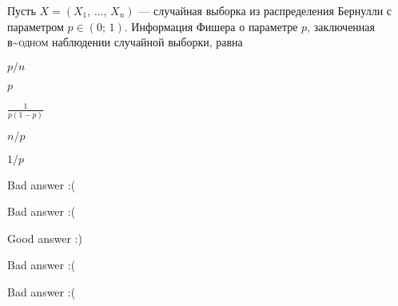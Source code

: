 
\begin{question}
Пусть \(X = (X_1, \, \ldots, \, X_n)\) --- случайная выборка из
распределения Бернулли с параметром \(p \in (0;\,1)\). Информация Фишера
о параметре \(p\), заключенная в\textasciitilde{}\textsc{одном}
наблюдении случайной выборки, равна
\begin{answerlist}
  \item \(p/n\)
  \item \(p\)
  \item \(\frac{1}{p(1-p)}\)
  \item \(n/p\)
  \item \(1/p\)
\end{answerlist}
\end{question}

\begin{solution}
\begin{answerlist}
  \item Bad answer :(
  \item Bad answer :(
  \item Good answer :)
  \item Bad answer :(
  \item Bad answer :(
\end{answerlist}
\end{solution}

